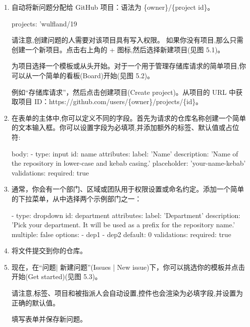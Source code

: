 \begin{enumerate}
\item 
自动将新问题分配给 GitHub 项目：语法为 \{owner\}/\{project id\}。

\begin{shell}
projects: 'wulfland/19
\end{shell}

请注意,创建问题的人需要对该项目具有写入权限。
如果你没有项目,那么只需创建一个新项目。点击右上角的 + 图标,然后选择新建项目(见图 5.1)。


为项目选择一个模板或从头开始。对于一个用于管理存储库请求的简单项目,你可以从一个简单的看板(Board)开始(见图 5.2)。


例如“存储库请求”，然后点击创建项目(Create project)。从项目的 URL 中获取项目 ID：https://github.com/users/\{owner\}/projects/\{id\}。

\item 
在表单的主体中,你可以定义不同的字段。首先为请求的仓库名称创建一个简单的文本输入框。你可以设置字段为必填项,并添加额外的标签、默认值或占位符:

\begin{shell}
body:
  - type: input
    id: name
    attributes:
      label: 'Name'
      description: 'Name of the repository in lower-case and
kebab casing.'
      placeholder: 'your-name-kebab'
    validations:
      required: true
\end{shell}

\item 
通常，你会有一个部门、区域或团队用于权限设置或命名约定。添加一个简单的下拉菜单，从中选择两个示例部门之一：

\begin{shell}
- type: dropdown
  id: department
  attributes:
    label: 'Department'
    description: 'Pick your department. It will be used as a   prefix for the repository name.'
    multiple: false
    options:
      - dep1
      - dep2
    default: 0
  validations:
    required: true
\end{shell}

\item 
将文件提交到你的仓库。

\item 
现在，在“问题| 新建问题”(Issues | New issue)下，你可以挑选你的模板并点击开始(Get started)(见图 5.3)。


请注意,标签、项目和被指派人会自动设置,控件也会渲染为必填字段,并设置为正确的默认值。


填写表单并保存新问题。

\end{enumerate}

